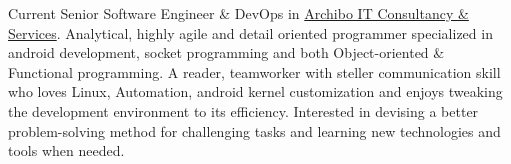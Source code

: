 

\begin{cvparagraph}

Current Senior Software Engineer \& DevOps in {\href{http://www.archibo.de}{Archibo IT Consultancy \& Services}}. 
Analytical, highly agile and detail oriented programmer specialized in android development, socket programming and both Object-oriented \& Functional programming. 
A reader, teamworker with steller communication skill who loves Linux, Automation, android kernel customization and enjoys tweaking the development environment to its efficiency. 
Interested in devising a better problem-solving method for challenging tasks and learning new technologies and tools when needed.
\end{cvparagraph}
